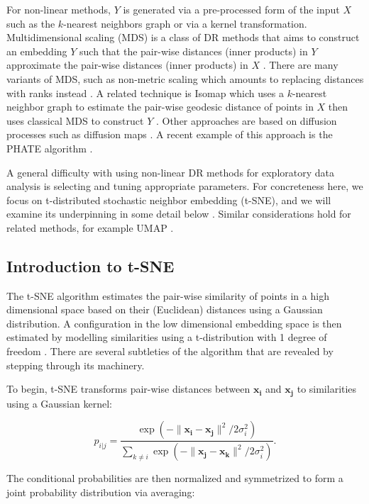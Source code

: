 \documentclass[article,notitle]{jdssv}
\begin{document}
For non-linear methods, \(Y\) is generated via a pre-processed form of the input
\(X\) such as the \(k\)-nearest neighbors graph or via a kernel transformation.
Multidimensional scaling (MDS) is a class of DR methods that aims to construct
an embedding \(Y\) such that the pair-wise distances (inner products) in \(Y\)
approximate the pair-wise distances (inner products) in \(X\)
\citep{Torgerson1952-am, Kruskal1964-cz}. There are many
variants of MDS, such as non-metric scaling which amounts to replacing
distances with ranks instead \citep{Kruskal1964-cw}.
A related technique is Isomap which uses a \(k\)-nearest neighbor graph
to estimate the pair-wise geodesic distance of points in \(X\) then uses classical
MDS to construct \(Y\) \citep{Silva2003-xw}. Other approaches are based on diffusion
processes such as diffusion maps \citep{Coifman2005-ak}. A recent example of this
approach is the PHATE algorithm \citep{Moon2019-ce}.

A general difficulty with using
non-linear DR methods for exploratory data analysis is selecting and tuning
appropriate parameters. For concreteness here, we focus on t-distributed
stochastic neighbor embedding (t-SNE), and we will examine
its underpinning in some detail below \citep{Maaten2008-sk}. Similar considerations hold for related
methods, for example UMAP \citep{McInnes2018-co}.

\hypertarget{introduction-to-t-sne}{%
\subsection{Introduction to t-SNE}\label{introduction-to-t-sne}}

The t-SNE algorithm estimates the pair-wise similarity of points in a high
dimensional space based on their (Euclidean) distances using a Gaussian
distribution. A configuration in the low dimensional embedding space is then
estimated by modelling similarities using a t-distribution with 1 degree of
freedom \citep{Maaten2008-sk}. There are several subtleties of the algorithm that
are revealed by stepping through its machinery.

To begin, t-SNE transforms pair-wise distances between \(\mathbf{x_i}\) and
\(\mathbf{x_j}\) to similarities using a Gaussian kernel:

\[ 
p_{i|j} = \frac{\exp(-\lVert \mathbf{x_i - x_j} \rVert ^ 2 /
2\sigma_i^2)}{\sum_{k \ne i}\exp(-\lVert \mathbf{x_j - x_k} \rVert ^ 2 /
2\sigma_i^2)}. 
\]

The conditional probabilities are then normalized and symmetrized to form a
joint probability distribution via averaging:
\end{document}
